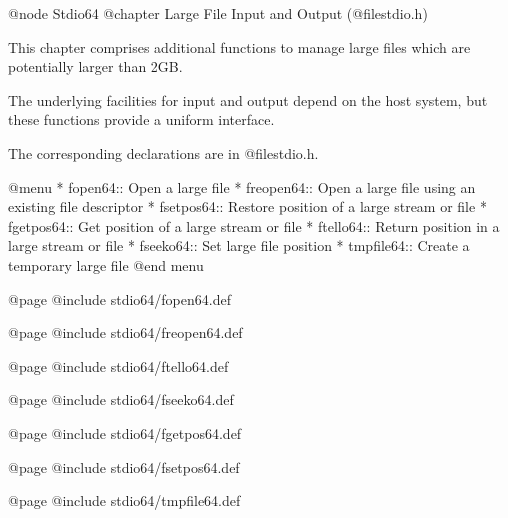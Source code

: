 @node Stdio64
@chapter Large File Input and Output (@file{stdio.h}) 

This chapter comprises additional functions to manage large files which
are potentially larger than 2GB.

The underlying facilities for input and output depend on the host
system, but these functions provide a uniform interface.

The corresponding declarations are in @file{stdio.h}.

@menu  
* fopen64::     Open a large file
* freopen64::   Open a large file using an existing file descriptor
* fsetpos64::   Restore position of a large stream or file
* fgetpos64::   Get position of a large stream or file
* ftello64::    Return position in a large stream or file
* fseeko64::    Set large file position
* tmpfile64::   Create a temporary large file
@end menu 

@page
@include stdio64/fopen64.def

@page
@include stdio64/freopen64.def

@page 
@include stdio64/ftello64.def 

@page
@include stdio64/fseeko64.def

@page
@include stdio64/fgetpos64.def

@page
@include stdio64/fsetpos64.def

@page
@include stdio64/tmpfile64.def

